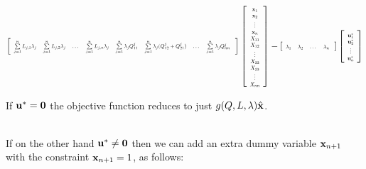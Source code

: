 $\left[
\scalebox{0.6}{%
	\begin{tabular}{ c c c c c c c c}
	$\sum\limits_{j=1}^nL_{j,1}\lambda_j$ & $\sum\limits_{j=1}^nL_{j,2}\lambda_j$ & $\dots$ & $\sum\limits_{j=1}^nL_{j,n}\lambda_j$ & $\sum\limits_{j=1}^n\lambda_jQ_{11}^j$ & $\sum\limits_{j=1}^n\lambda_j(Q_{12}^j+Q_{21}^j)$ & $\dots$ & $\sum\limits_{j=1}^n\lambda_jQ_{nn}^j$ \\ 
	\end{tabular}
}
\right] \left[
\scalebox{0.6}{%
	\begin{tabular}{ c }
	$\vx_1$ \\ 
	$\vx_2$ \\  
	$\vdots$ \\
	$\vx_n$ \\
	$X_{11}$ \\ 
	$X_{12}$  \\
	$\vdots$ \\
	$X_{22}$\\
	$X_{23}$\\
	$\vdots$ \\
	$X_{nn}$ 
	\end{tabular}%
}
\right] 
-
\left[
\scalebox{0.6}{%
	\begin{tabular}{ c c c c c c c c}
	$\lambda_1$ & $\lambda_2$ & $\dots$ & $\lambda_n$ \\ 
	\end{tabular}
}
\right] \left[
\scalebox{0.6}{%
	\begin{tabular}{ c }
	$\vu^*_1$ \\ 
	$\vu^*_2$ \\  
	$\vdots$ \\
	$\vu^*_n$ \\
	\end{tabular}%
}
\right] 
$

If $\mathbf{u}^*=\textbf{0}$ the objective function reduces to just $g(Q,L,\lambda)\hat{\mathbf{x}}$.

\ \\

If on the other hand $\mathbf{u}^*\neq \textbf{0}$ then we can add an extra dummy variable $\mathbf{x}_{n+1}$ with the constraint $\mathbf{x}_{n+1}=1$, as follows:

